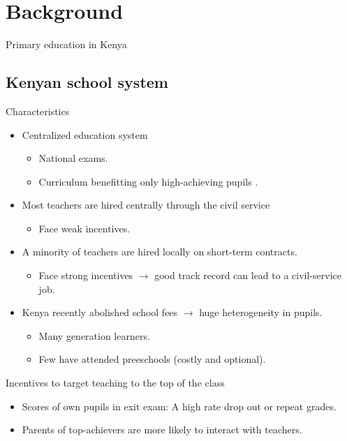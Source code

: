 \documentclass[9pt]{beamer}
\numberwithin{equation}{section}
\begin{document}
\section{Background}

\begin{frame}{Primary education in Kenya}
  \subsection{Kenyan school system}
  Characteristics
  \begin{itemize}
    \item Centralized education system
    \begin{itemize}
      \item National exams.
      \item Curriculum benefitting only high-achieving pupils \citep{glewwe2009many}.
    \end{itemize}
    \item Most teachers are hired centrally through the civil service
    \begin{itemize}
      \item Face weak incentives.
    \end{itemize}
    \item A minority of teachers are hired locally on short-term contracts.
    \begin{itemize}
      \item Face strong incentives $\rightarrow$ good track record can lead to a civil-service job.
    \end{itemize}
    \item Kenya recently abolished school fees $\rightarrow$ huge heterogeneity in pupils.
    \begin{itemize}
      \item Many  generation learners.
      \item Few have attended preeschools (costly and optional).
    \end{itemize}
  \end{itemize}
  Incentives to target teaching to the top of the class
  \begin{itemize}
    \item Scores of own pupils in exit exam: A high rate drop out or repeat grades.
    \item Parents of top-achievers are more likely to interact with teachers.
  \end{itemize}
\end{frame}
\end{document}
